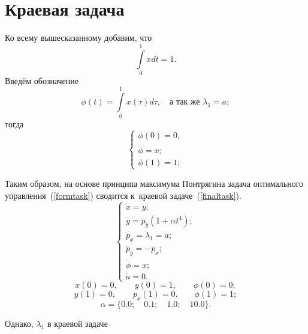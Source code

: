 \section{Краевая задача}
Ко всему вышесказанному добавим, что 
\[
\int\limits_{0}^{1} x dt = 1.
\]
Введём обозначение
\[
\phi(t) = \int\limits_{0}^{1} x(\tau) d\tau, \quad \text{а так же } \lambda_1 = a;
\]
тогда 
\begin{equation}\label{dopeqq}
\begin{cases}
\phi(0) = 0,\\ 
\dot\phi = x;\\
\phi(1) = 1;
\end{cases}
\end{equation}

Таким образом, на основе принципа максимума Понтрягина задача оптимального управления~(\ref{formtask}) сводится к~краевой задаче~(\ref{finaltask}). 
\begin{equation}\label{finaltask}
	\begin{cases}
	\dot{x} = y; \\
	\dot{y} = p_y (1 + \alpha t^4);\\ %
	\dot{p}_x = \lambda_1 = a; \\
	\dot{p}_y = - p_x;\\
	\dot\phi = x;\\
	\dot{a} = 0.
	\end{cases}
\end{equation}
\[
	x(0) = 0, \qquad y(0) = 1, \qquad \phi(0) = 0;
\]
\[
 	y(1) = 0, \qquad p_x(1) = 0. \qquad \phi(1) = 1;
\]
\[ \alpha = \{0.0;\quad 0.1; \quad 1.0; \quad 10.0\}.\]

Однако, $\lambda_1$ в краевой задаче


